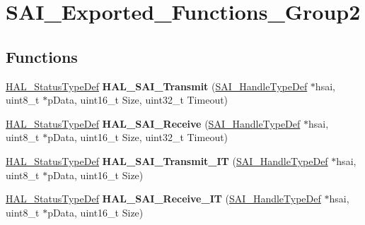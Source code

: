 \hypertarget{group___s_a_i___exported___functions___group2}{}\section{S\+A\+I\+\_\+\+Exported\+\_\+\+Functions\+\_\+\+Group2}
\label{group___s_a_i___exported___functions___group2}
\subsection*{Functions}
\begin{DoxyCompactItemize}
\item 
\hyperlink{stm32f4xx__hal__def_8h_a63c0679d1cb8b8c684fbb0632743478f}{H\+A\+L\+\_\+\+Status\+Type\+Def} {\bfseries H\+A\+L\+\_\+\+S\+A\+I\+\_\+\+Transmit} (\hyperlink{group___s_a_i___exported___types_gaf45214e5c90f73800130b3945bf45144}{S\+A\+I\+\_\+\+Handle\+Type\+Def} $\ast$hsai, uint8\+\_\+t $\ast$p\+Data, uint16\+\_\+t Size, uint32\+\_\+t Timeout)\hypertarget{group___s_a_i___exported___functions___group2_ga84b44d192218bb052d09e7cc937bdc43}{}\label{group___s_a_i___exported___functions___group2_ga84b44d192218bb052d09e7cc937bdc43}

\item 
\hyperlink{stm32f4xx__hal__def_8h_a63c0679d1cb8b8c684fbb0632743478f}{H\+A\+L\+\_\+\+Status\+Type\+Def} {\bfseries H\+A\+L\+\_\+\+S\+A\+I\+\_\+\+Receive} (\hyperlink{group___s_a_i___exported___types_gaf45214e5c90f73800130b3945bf45144}{S\+A\+I\+\_\+\+Handle\+Type\+Def} $\ast$hsai, uint8\+\_\+t $\ast$p\+Data, uint16\+\_\+t Size, uint32\+\_\+t Timeout)\hypertarget{group___s_a_i___exported___functions___group2_ga417df575df3654f051606df3a468c899}{}\label{group___s_a_i___exported___functions___group2_ga417df575df3654f051606df3a468c899}

\item 
\hyperlink{stm32f4xx__hal__def_8h_a63c0679d1cb8b8c684fbb0632743478f}{H\+A\+L\+\_\+\+Status\+Type\+Def} {\bfseries H\+A\+L\+\_\+\+S\+A\+I\+\_\+\+Transmit\+\_\+\+IT} (\hyperlink{group___s_a_i___exported___types_gaf45214e5c90f73800130b3945bf45144}{S\+A\+I\+\_\+\+Handle\+Type\+Def} $\ast$hsai, uint8\+\_\+t $\ast$p\+Data, uint16\+\_\+t Size)\hypertarget{group___s_a_i___exported___functions___group2_ga5c4db08e12044729c7f17a1edc18be0f}{}\label{group___s_a_i___exported___functions___group2_ga5c4db08e12044729c7f17a1edc18be0f}

\item 
\hyperlink{stm32f4xx__hal__def_8h_a63c0679d1cb8b8c684fbb0632743478f}{H\+A\+L\+\_\+\+Status\+Type\+Def} {\bfseries H\+A\+L\+\_\+\+S\+A\+I\+\_\+\+Receive\+\_\+\+IT} (\hyperlink{group___s_a_i___exported___types_gaf45214e5c90f73800130b3945bf45144}{S\+A\+I\+\_\+\+Handle\+Type\+Def} $\ast$hsai, uint8\+\_\+t $\ast$p\+Data, uint16\+\_\+t Size)\hypertarget{group___s_a_i___exported___functions___group2_ga627c6ee457cf7797c10391150e55843e}{}\label{group___s_a_i___exported___functions___group2_ga627c6ee457cf7797c10391150e55843e}


\end{DoxyCompactItemize}
